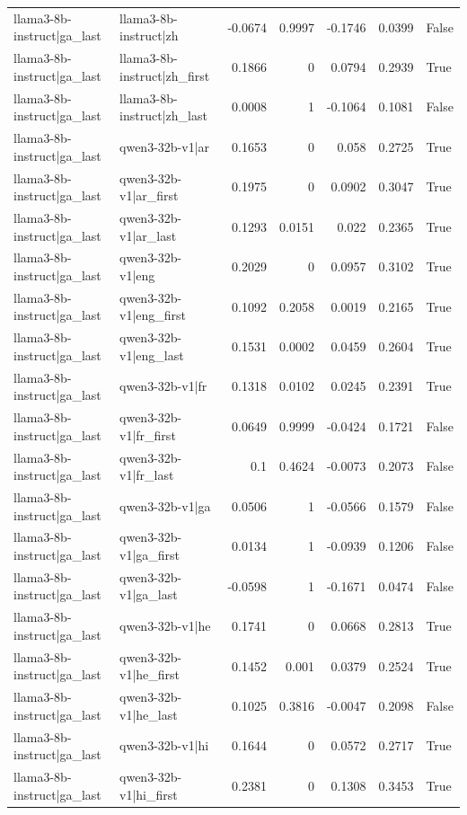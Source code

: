 \begin{table}
\begin{tabular}{l l r r r r l}
llama3-8b-instruct|ga_last & llama3-8b-instruct|zh & -0.0674 & 0.9997 & -0.1746 & 0.0399 & False \\
llama3-8b-instruct|ga_last & llama3-8b-instruct|zh_first & 0.1866 & 0 & 0.0794 & 0.2939 & True \\
llama3-8b-instruct|ga_last & llama3-8b-instruct|zh_last & 0.0008 & 1 & -0.1064 & 0.1081 & False \\
llama3-8b-instruct|ga_last & qwen3-32b-v1|ar & 0.1653 & 0 & 0.058 & 0.2725 & True \\
llama3-8b-instruct|ga_last & qwen3-32b-v1|ar_first & 0.1975 & 0 & 0.0902 & 0.3047 & True \\
llama3-8b-instruct|ga_last & qwen3-32b-v1|ar_last & 0.1293 & 0.0151 & 0.022 & 0.2365 & True \\
llama3-8b-instruct|ga_last & qwen3-32b-v1|eng & 0.2029 & 0 & 0.0957 & 0.3102 & True \\
llama3-8b-instruct|ga_last & qwen3-32b-v1|eng_first & 0.1092 & 0.2058 & 0.0019 & 0.2165 & True \\
llama3-8b-instruct|ga_last & qwen3-32b-v1|eng_last & 0.1531 & 0.0002 & 0.0459 & 0.2604 & True \\
llama3-8b-instruct|ga_last & qwen3-32b-v1|fr & 0.1318 & 0.0102 & 0.0245 & 0.2391 & True \\
llama3-8b-instruct|ga_last & qwen3-32b-v1|fr_first & 0.0649 & 0.9999 & -0.0424 & 0.1721 & False \\
llama3-8b-instruct|ga_last & qwen3-32b-v1|fr_last & 0.1 & 0.4624 & -0.0073 & 0.2073 & False \\
llama3-8b-instruct|ga_last & qwen3-32b-v1|ga & 0.0506 & 1 & -0.0566 & 0.1579 & False \\
llama3-8b-instruct|ga_last & qwen3-32b-v1|ga_first & 0.0134 & 1 & -0.0939 & 0.1206 & False \\
llama3-8b-instruct|ga_last & qwen3-32b-v1|ga_last & -0.0598 & 1 & -0.1671 & 0.0474 & False \\
llama3-8b-instruct|ga_last & qwen3-32b-v1|he & 0.1741 & 0 & 0.0668 & 0.2813 & True \\
llama3-8b-instruct|ga_last & qwen3-32b-v1|he_first & 0.1452 & 0.001 & 0.0379 & 0.2524 & True \\
llama3-8b-instruct|ga_last & qwen3-32b-v1|he_last & 0.1025 & 0.3816 & -0.0047 & 0.2098 & False \\
llama3-8b-instruct|ga_last & qwen3-32b-v1|hi & 0.1644 & 0 & 0.0572 & 0.2717 & True \\
llama3-8b-instruct|ga_last & qwen3-32b-v1|hi_first & 0.2381 & 0 & 0.1308 & 0.3453 & True \\

\end{tabular}
\end{table}
